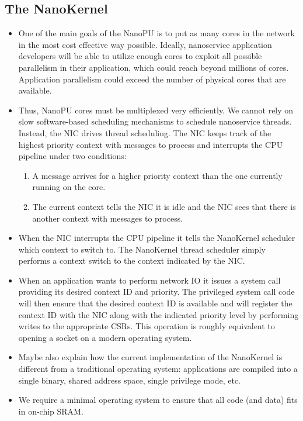 \subsection{The NanoKernel}
\begin{itemize}
    \item One of the main goals of the NanoPU is to put as many cores in the network in the most cost effective way possible. Ideally, nanoservice application developers will be able to utilize enough cores to exploit all possible parallelism in their application, which could reach beyond millions of cores. Application parallelism could exceed the number of physical cores that are available. 
    \item Thus, NanoPU cores must be multiplexed very efficiently. We cannot rely on slow software-based scheduling mechanisms to schedule nanoservice threads. Instead, the NIC drives thread scheduling. The NIC keeps track of the highest priority context with messages to process and interrupts the CPU pipeline under two conditions:
    \begin{enumerate}
        \item A message arrives for a higher priority context than the one currently running on the core.
        \item The current context tells the NIC it is idle and the NIC sees that there is another context with messages to process.
    \end{enumerate}
    \item When the NIC interrupts the CPU pipeline it tells the NanoKernel scheduler which context to switch to. The NanoKernel thread scheduler simply performs a context switch to the context indicated by the NIC.
    \item When an application wants to perform network IO it issues a system call providing its desired context ID and priority. The privileged system call code will then ensure that the desired context ID is available and will register the context ID with the NIC along with the indicated priority level by performing writes to the appropriate CSRs. This operation is roughly equivalent to opening a socket on a modern operating system.
    \item Maybe also explain how the current implementation of the NanoKernel is different from a traditional operating system: applications are compiled into a single binary, shared address space, single privilege mode, etc.
    \item We require a minimal operating system to ensure that all code (and data) fits in on-chip SRAM.
\end{itemize}